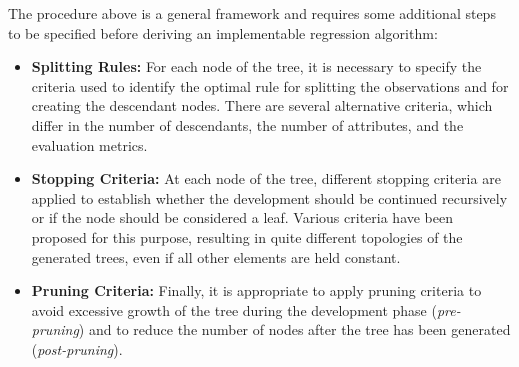The procedure above is a general framework and requires some additional steps to be specified before deriving an implementable regression algorithm:
\begin{itemize}
    \item \textbf{Splitting Rules:} For each node of the tree, it is necessary to specify the criteria used to identify the optimal rule for splitting the observations and for creating the descendant nodes. There are several alternative criteria, which differ in the number of descendants, the number of attributes, and the evaluation metrics.
    \item \textbf{Stopping Criteria:} At each node of the tree, different stopping criteria are applied to establish whether the development should be continued recursively or if the node should be considered a leaf. Various criteria have been proposed for this purpose, resulting in quite different topologies of the generated trees, even if all other elements are held constant.
    \item \textbf{Pruning Criteria:} Finally, it is appropriate to apply pruning criteria to avoid excessive growth of the tree during the development phase (\textit{pre-pruning}) and to reduce the number of nodes after the tree has been generated (\textit{post-pruning}).
\end{itemize}

